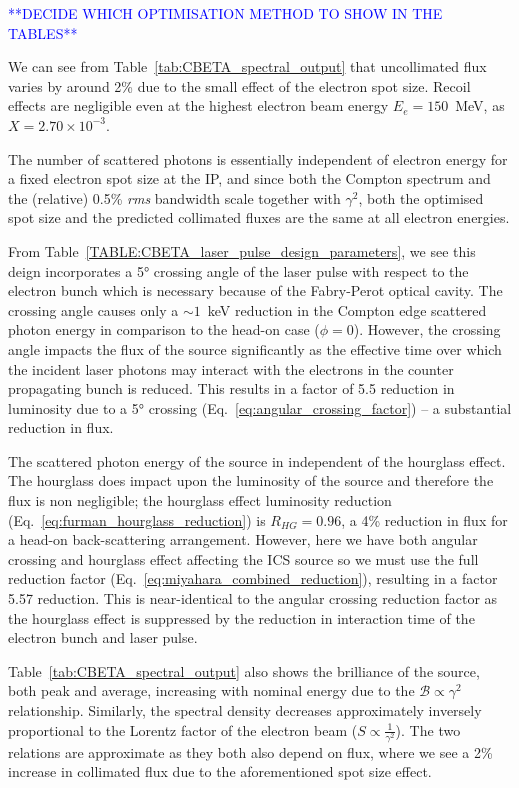 \documentclass[../main.tex]{subfiles}
\begin{document}
\textcolor{blue}{**DECIDE WHICH OPTIMISATION METHOD TO SHOW IN THE TABLES**}

We can see from Table~\ref{tab:CBETA_spectral_output} that uncollimated flux varies by around 2\% due to the small effect of the electron spot size. Recoil effects are negligible even at the highest electron beam energy $E_{e} = 150$~\si{\mega\electronvolt}, as $X = 2.70\times 10^{-3}$.  

The number of scattered photons is essentially independent of electron energy for a fixed electron spot size at the IP, and since both the Compton spectrum and the (relative) 0.5\% \textit{rms} bandwidth scale together with $\gamma^2$, both the optimised spot size and the predicted collimated fluxes are the same at all electron energies.

From Table~\ref{TABLE:CBETA_laser_pulse_design_parameters}, we see this deign incorporates a 5\si{\degree} crossing angle of the laser pulse with respect to the electron bunch which is necessary because of the Fabry-Perot optical cavity. The crossing angle causes only a $\sim 1$~\si{\kilo\electronvolt} reduction in the Compton edge scattered photon energy in comparison to the head-on case ($\phi = 0$). However, the crossing angle impacts the flux of the source significantly as the effective time over which the incident laser photons may interact with the electrons in the counter propagating bunch is reduced. This results in a factor of 5.5 reduction in luminosity due to a 5\si{\degree} crossing (Eq.~\ref{eq:angular_crossing_factor}) -- a substantial reduction in flux. 

The scattered photon energy of the source in independent of the hourglass effect. The hourglass does impact upon the luminosity of the source and therefore the flux is non negligible; the hourglass effect luminosity reduction (Eq.~\ref{eq:furman_hourglass_reduction}) is $R_{HG} = 0.96$, a 4\% reduction in flux for a head-on back-scattering arrangement. However, here we have both angular crossing and hourglass effect affecting the ICS source so we must use the full reduction factor (Eq.~\ref{eq:miyahara_combined_reduction}), resulting in a factor 5.57 reduction. This is near-identical to the angular crossing reduction factor as the hourglass effect is suppressed by the reduction in interaction time of the electron bunch and laser pulse. 

Table~\ref{tab:CBETA_spectral_output} also shows the brilliance of the source, both peak and average, increasing with nominal energy due to the $\mathcal{B} \propto \gamma^{2}$ relationship. Similarly, the spectral density decreases approximately inversely proportional to the Lorentz factor of the electron beam ($S \propto \frac{1}{\gamma^{2}}$). The two relations are approximate as they both also depend on flux, where we see a 2\% increase in collimated flux due to the aforementioned spot size effect. 
\end{document}
